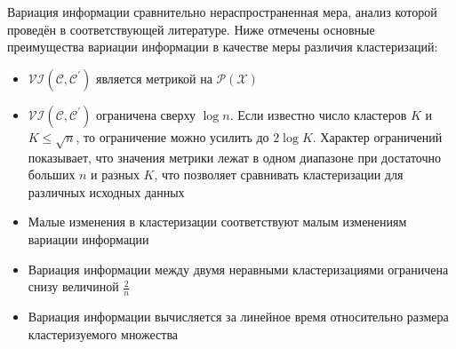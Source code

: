 Вариация информации сравнительно нераспространенная мера, анализ которой проведён в соответствующей литературе. Ниже отмечены основные преимущества вариации информации в качестве меры различия кластеризаций:
\begin{itemize}
	\item $\mathcal{VI(C,C^\prime)}$ является метрикой на $\mathcal{P(X)}$
	\item $\mathcal{VI(C,C^\prime)}$ ограничена сверху $\log n$. Если известно число кластеров $K$ и $K \leq \sqrt{n}$, то ограничение можно усилить до $2\log K$. Характер ограничений показывает, что значения метрики лежат в одном диапазоне при достаточно больших $n$ и разных $K$, что позволяет сравнивать кластеризации для различных исходных данных
	\item Малые изменения в кластеризации соответствуют малым изменениям вариации информации
	\item Вариация информации между двумя неравными кластеризациями ограничена снизу величиной $\frac2n$
	\item Вариация информации вычисляется за линейное время относительно размера кластеризуемого множества
\end{itemize}